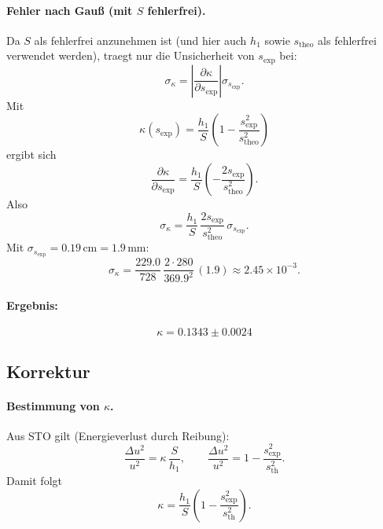 \documentclass{article}
\begin{document}
\paragraph{Fehler nach Gau{\ss} (mit \texorpdfstring{$S$}{S} fehlerfrei).}
Da $S$ als fehlerfrei anzunehmen ist (und hier auch $h_1$ sowie $s_\mathrm{theo}$ als fehlerfrei verwendet werden),
traegt nur die Unsicherheit von $s_\mathrm{exp}$ bei:
\begin{equation}
\sigma_\kappa
=\left|\frac{\partial \kappa}{\partial s_\mathrm{exp}}\right|\sigma_{s_\mathrm{exp}}.
\end{equation}
Mit
\begin{equation}
\kappa(s_\mathrm{exp})=\frac{h_1}{S}\left(1-\frac{s_\mathrm{exp}^2}{s_\mathrm{theo}^2}\right)
\end{equation}
ergibt sich
\begin{equation}
\frac{\partial \kappa}{\partial s_\mathrm{exp}}
=\frac{h_1}{S}\left(-\frac{2s_\mathrm{exp}}{s_\mathrm{theo}^2}\right).
\end{equation}
Also
\begin{equation}
\sigma_\kappa
=\frac{h_1}{S}\,\frac{2s_\mathrm{exp}}{s_\mathrm{theo}^2}\,\sigma_{s_\mathrm{exp}}.
\end{equation}
Mit $\sigma_{s_\mathrm{exp}}=0.19\,\mathrm{cm}=1.9\,\mathrm{mm}$:
\begin{equation}
\sigma_\kappa
=\frac{229.0}{728}\,\frac{2\cdot 280}{369.9^2}\,(1.9)
\approx 2.45\times 10^{-3}.
\end{equation}

\paragraph{Ergebnis:}
\begin{equation}
{\kappa = 0.1343 \pm 0.0024}
\end{equation}

\subsection{Korrektur}
\paragraph{Bestimmung von \texorpdfstring{$\kappa$}{kappa}.}
Aus STO gilt (Energieverlust durch Reibung):
\begin{equation}
\frac{\Delta u^2}{u^2}=\kappa\,\frac{S}{h_1},
\qquad
\frac{\Delta u^2}{u^2}=1-\frac{s_\mathrm{exp}^2}{s_\mathrm{th}^2}.
\end{equation}
Damit folgt
\begin{equation}
\kappa=\frac{h_1}{S}\left(1-\frac{s_\mathrm{exp}^2}{s_\mathrm{th}^2}\right).
\end{equation}
\end{document}
